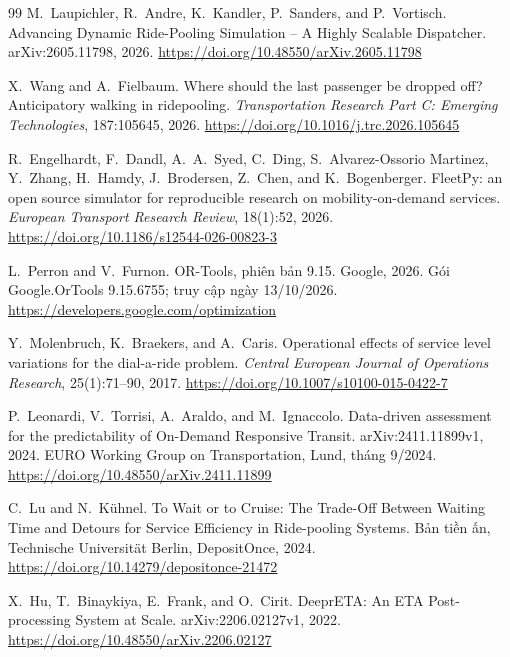 \begin{thebibliography}{99}
M.~Laupichler, R.~Andre, K.~Kandler, P.~Sanders, and P.~Vortisch.
\newblock Advancing Dynamic Ride-Pooling Simulation -- A Highly Scalable Dispatcher.
\newblock arXiv:2605.11798, 2026.
\newblock \url{https://doi.org/10.48550/arXiv.2605.11798}

X.~Wang and A.~Fielbaum.
\newblock Where should the last passenger be dropped off? Anticipatory walking in ridepooling.
\newblock \emph{Transportation Research Part C: Emerging Technologies}, 187:105645, 2026.
\newblock \url{https://doi.org/10.1016/j.trc.2026.105645}

R.~Engelhardt, F.~Dandl, A.~A.~Syed, C.~Ding, S.~Alvarez-Ossorio Martinez, Y.~Zhang, H.~Hamdy,
J.~Brodersen, Z.~Chen, and K.~Bogenberger.
\newblock FleetPy: an open source simulator for reproducible research on mobility-on-demand services.
\newblock \emph{European Transport Research Review}, 18(1):52, 2026.
\newblock \url{https://doi.org/10.1186/s12544-026-00823-3}

L.~Perron and V.~Furnon.
\newblock OR-Tools, phiên bản 9.15.
\newblock Google, 2026. Gói Google.OrTools 9.15.6755; truy cập ngày 13/10/2026.
\newblock \url{https://developers.google.com/optimization}

Y.~Molenbruch, K.~Braekers, and A.~Caris.
\newblock Operational effects of service level variations for the dial-a-ride problem.
\newblock \emph{Central European Journal of Operations Research}, 25(1):71--90, 2017.
\newblock \url{https://doi.org/10.1007/s10100-015-0422-7}

P.~Leonardi, V.~Torrisi, A.~Araldo, and M.~Ignaccolo.
\newblock Data-driven assessment for the predictability of On-Demand Responsive Transit.
\newblock arXiv:2411.11899v1, 2024. EURO Working Group on Transportation, Lund, tháng 9/2024.
\newblock \url{https://doi.org/10.48550/arXiv.2411.11899}

C.~Lu and N.~Kühnel.
\newblock To Wait or to Cruise: The Trade-Off Between Waiting Time and Detours for Service Efficiency in Ride-pooling Systems.
\newblock Bản tiền ấn, Technische Universität Berlin, DepositOnce, 2024.
\newblock \url{https://doi.org/10.14279/depositonce-21472}

X.~Hu, T.~Binaykiya, E.~Frank, and O.~Cirit.
\newblock DeeprETA: An ETA Post-processing System at Scale.
\newblock arXiv:2206.02127v1, 2022.
\newblock \url{https://doi.org/10.48550/arXiv.2206.02127}


\end{thebibliography}
